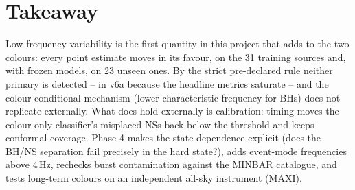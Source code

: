 \section{Takeaway}
Low-frequency variability is the first quantity in this project that adds to the two colours: every point estimate moves
in its favour, on the 31 training sources and, with frozen models, on 23 unseen ones. By the strict pre-declared rule
neither primary is detected -- in v6a because the headline metrics saturate -- and the colour-conditional mechanism
(lower characteristic frequency for BHs) does not replicate externally. What does hold externally is calibration: timing
moves the colour-only classifier's misplaced NSs back below the threshold and keeps conformal coverage. Phase 4 makes the
state dependence explicit (does the BH/NS separation fail precisely in the hard state?), adds event-mode frequencies above
4\,Hz, rechecks burst contamination against the MINBAR catalogue, and tests long-term colours on an independent all-sky
instrument (MAXI).
